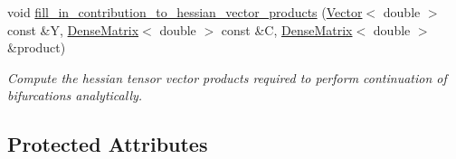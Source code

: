\begin{DoxyCompactItemize}
void \hyperlink{classoomph_1_1GeneralisedNewtonianNavierStokesEquations_af994107ca05228c14a8e63ae8793f4c3}{fill\+\_\+in\+\_\+contribution\+\_\+to\+\_\+hessian\+\_\+vector\+\_\+products} (\hyperlink{classoomph_1_1Vector}{Vector}$<$ double $>$ const \&Y, \hyperlink{classoomph_1_1DenseMatrix}{Dense\+Matrix}$<$ double $>$ const \&C, \hyperlink{classoomph_1_1DenseMatrix}{Dense\+Matrix}$<$ double $>$ \&product)
\begin{DoxyCompactList}\small\item\em Compute the hessian tensor vector products required to perform continuation of bifurcations analytically. \end{DoxyCompactList}\end{DoxyCompactItemize}
\subsection*{Protected Attributes}

